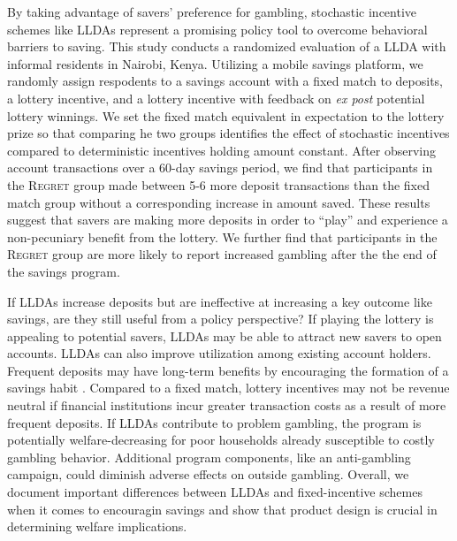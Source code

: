 \documentclass[12pt]{article}
\begin{document}
		By taking advantage of savers' preference for gambling, stochastic incentive schemes like LLDAs represent a promising policy tool to overcome behavioral barriers to saving. This study conducts a randomized evaluation of a LLDA with informal residents in Nairobi, Kenya. Utilizing a mobile savings platform, we randomly assign respodents to a savings account with a fixed match to deposits, a lottery incentive, and a lottery incentive with feedback on \textit{ex post} potential lottery winnings. We set the fixed match equivalent in expectation to the lottery prize so that comparing he two groups identifies the effect of stochastic incentives compared to deterministic incentives holding amount constant. After observing account transactions over a 60-day savings period, we find that participants in the \textsc{Regret} group made between 5-6 more deposit transactions than the fixed match group without a corresponding increase in amount saved. These results suggest that savers are making more deposits in order to ``play'' and experience a non-pecuniary benefit from the lottery. We further find that participants in the \textsc{Regret} group are more likely to report increased gambling after the the end of the savings program.

		If LLDAs increase deposits but are ineffective at increasing a key outcome like savings, are they still useful from a policy perspective? If playing the lottery is appealing to potential savers, LLDAs may be able to attract new savers to open  accounts. LLDAs can also improve utilization among existing account holders. Frequent deposits may have long-term benefits by encouraging the formation of a savings habit . Compared to a fixed match, lottery incentives may not be revenue neutral if financial institutions incur greater transaction costs as a result of more frequent deposits. If LLDAs contribute to problem gambling, the program is potentially welfare-decreasing for poor households already susceptible to costly gambling behavior. Additional program components, like an anti-gambling campaign, could diminish adverse effects on outside gambling. Overall, we document important differences between LLDAs and fixed-incentive schemes when it comes to encouragin savings and show that product design is crucial in determining welfare implications.

\end{document}
